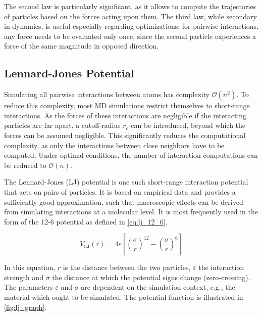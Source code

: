 The second law is particularly significant, as it allows to compute the trajectories of particles based on the forces acting upon them. The third law, while secondary in dynamics, is useful especially regarding optimizations: for pairwise interactions, any force needs to be evaluated only once, since the second particle experiences a force of the same magnitude in opposed direction. \cite{Gratl2021}

\subsection{Lennard-Jones Potential}
\label{sec:lj_potential}
Simulating all pairwise interactions between atoms has complexity $\mathcal{O}\left(n^2\right)$. To reduce this complexity, most MD simulations restrict themselves to short-range interactions. As the forces of these interactions are negligible if the interacting particles are far apart, a cutoff-radius $r_c$ can be introduced, beyond which the forces can be assumed negligible. This significantly reduces the computational complexity, as only the interactions between close neighbors have to be computed. Under optimal conditions, the number of interaction computations can be reduced to $\mathcal{O}\left(n\right)$. \cite{Gratl2021}

The Lennard-Jones (LJ) potential is one such short-range interaction potential that acts on pairs of particles. It is based on empirical data and provides a sufficiently good approximation, such that macroscopic effects can be derived from simulating interactions at a molecular level.
It is most frequently used in the form of the 12-6 potential as defined in \eqref{eq:lj_12_6}. \cite{Lenhard2024}

\begin{equation}
	V_{\text{LJ}}(r)=4\varepsilon\left[\left(\frac{\sigma}{r}\right)^{12}-\left(\frac{\sigma}{r}\right)^{6}\right]\label{eq:lj_12_6}
\end{equation}

In this equation, $r$ is the distance between the two particles, $\varepsilon$ the interaction strength and $\sigma$ the distance at which the potential signs change (zero-crossing). The parameters $\varepsilon$ and $\sigma$ are dependent on the simulation context, e.g., the material which ought to be simulated. The potential function is illustrated in \autoref{fig:lj_graph}. \cite{Wang2020, Lenhard2024}


